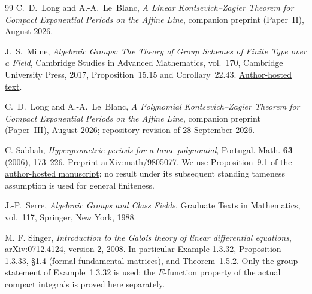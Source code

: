 \documentclass[11pt]{article}
\numberwithin{equation}{section}
\theoremstyle{definition}
\theoremstyle{remark}
\begin{document}
\begin{thebibliography}{99}
C.~D.~Long and A.-A.~Le~Blanc,
\emph{A Linear Kontsevich--Zagier Theorem for Compact Exponential Periods on
the Affine Line},
companion preprint (Paper~II), August 2026.

J.~S.~Milne,
\emph{Algebraic Groups: The Theory of Group Schemes of Finite Type
 over a Field}, Cambridge Studies in Advanced Mathematics, vol.~170,
Cambridge University Press, 2017, Proposition~15.15 and Corollary~22.43.
\href{https://www.jmilne.org/math/Books/iAG2017.pdf}{Author-hosted text}.

C.~D.~Long and A.-A.~Le~Blanc,
\emph{A Polynomial Kontsevich--Zagier Theorem for Compact Exponential Periods
on the Affine Line},
companion preprint (Paper~III), August 2026;
repository revision of 28 September 2026.

C. Sabbah, \emph{Hypergeometric periods for a tame polynomial},
Portugal. Math. \textbf{63} (2006), 173--226.
Preprint \href{https://arxiv.org/abs/math/9805077}{arXiv:math/9805077}.
We use Proposition~9.1 of the
\href{https://perso.pages.math.cnrs.fr/users/claude.sabbah/articles/sabbah_bbases.pdf}{author-hosted manuscript};
no result under its subsequent standing tameness assumption is used
for general finiteness.

J.-P.~Serre,
\emph{Algebraic Groups and Class Fields},
Graduate Texts in Mathematics, vol.~117, Springer, New York, 1988.

M. F. Singer, \emph{Introduction to the Galois theory of linear differential
equations}, \href{https://arxiv.org/abs/0712.4124}{arXiv:0712.4124},
version 2, 2008. In particular Example 1.3.32, Proposition 1.3.33,
\S1.4 (formal fundamental matrices), and Theorem~1.5.2.
Only the group statement of Example~1.3.32 is used; the $E$-function
property of the actual compact integrals is proved here separately.

\end{thebibliography}
\end{document}
